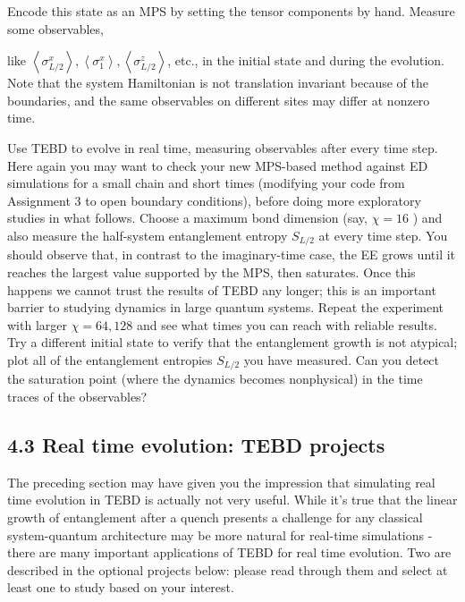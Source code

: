 \documentclass[12pt]{article}
\begin{document}
Encode this state as an MPS by setting the tensor components by hand. Measure some observables,

like $\left\langle\sigma_{L / 2}^{x}\right\rangle,\left\langle\sigma_{1}^{x}\right\rangle,\left\langle\sigma_{L / 2}^{z}\right\rangle$, etc., in the initial state and during the evolution. Note that the system Hamiltonian is not translation invariant because of the boundaries, and the same observables on different sites may differ at nonzero time.

Use TEBD to evolve in real time, measuring observables after every time step. Here again you may want to check your new MPS-based method against ED simulations for a small chain and short times (modifying your code from Assignment 3 to open boundary conditions), before doing more exploratory studies in what follows. Choose a maximum bond dimension (say, $\chi=16$ ) and also measure the half-system entanglement entropy $S_{L / 2}$ at every time step. You should observe that, in contrast to the imaginary-time case, the EE grows until it reaches the largest value supported by the MPS, then saturates. Once this happens we cannot trust the results of TEBD any longer; this is an important barrier to studying dynamics in large quantum systems. Repeat the experiment with larger $\chi=64,128$ and see what times you can reach with reliable results. Try a different initial state to verify that the entanglement growth is not atypical; plot all of the entanglement entropies $S_{L / 2}$ you have measured. Can you detect the saturation point (where the dynamics becomes nonphysical) in the time traces of the observables?

\subsection*{4.3 Real time evolution: TEBD projects}
The preceding section may have given you the impression that simulating real time evolution in TEBD is actually not very useful. While it's true that the linear growth of entanglement after a quench presents a challenge for any classical system-quantum architecture may be more natural for real-time simulations - there are many important applications of TEBD for real time evolution. Two are described in the optional projects below: please read through them and select at least one to study based on your interest.
\end{document}
